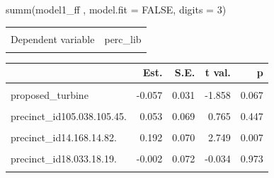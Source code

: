 \documentclass[
  letterpaper,
  DIV=11,
  numbers=noendperiod]{scrartcl}
\newenvironment{Shaded}{\begin{snugshade}}{\end{snugshade}}
\newcommand{\AttributeTok}[1]{\textcolor[rgb]{0.40,0.45,0.13}{#1}}
\newcommand{\ConstantTok}[1]{\textcolor[rgb]{0.56,0.35,0.01}{#1}}
\newcommand{\DecValTok}[1]{\textcolor[rgb]{0.68,0.00,0.00}{#1}}
\newcommand{\FunctionTok}[1]{\textcolor[rgb]{0.28,0.35,0.67}{#1}}
\newcommand{\NormalTok}[1]{\textcolor[rgb]{0.00,0.23,0.31}{#1}}
\begin{document}
\begin{Shaded}
\begin{Highlighting}[]
\FunctionTok{summ}\NormalTok{(model1\_ff , }\AttributeTok{model.fit =} \ConstantTok{FALSE}\NormalTok{, }\AttributeTok{digits =} \DecValTok{3}\NormalTok{)}
\end{Highlighting}
\end{Shaded}

\begin{table}[!h]
\centering
\begin{tabular}{lr}
\toprule
\cellcolor{gray!10}{Observations} & \cellcolor{gray!10}{120}\\
Dependent variable & perc\_lib\\
\cellcolor{gray!10}{Type} & \cellcolor{gray!10}{OLS linear regression}\\
\bottomrule
\end{tabular}
\end{table}  \begin{table}[!h]
\centering
\begin{threeparttable}
\begin{tabular}{lrrrr}
\toprule
  & Est. & S.E. & t val. & p\\
\midrule
\cellcolor{gray!10}{(Intercept)} & \cellcolor{gray!10}{0.275} & \cellcolor{gray!10}{0.050} & \cellcolor{gray!10}{5.460} & \cellcolor{gray!10}{0.000}\\
proposed\_turbine & -0.057 & 0.031 & -1.858 & 0.067\\
\cellcolor{gray!10}{precinct\_id10.115s.10.84.} & \cellcolor{gray!10}{0.166} & \cellcolor{gray!10}{0.069} & \cellcolor{gray!10}{2.402} & \cellcolor{gray!10}{0.019}\\
precinct\_id105.038.105.45. & 0.053 & 0.069 & 0.765 & 0.447\\
\cellcolor{gray!10}{precinct\_id14.149.14.79.} & \cellcolor{gray!10}{0.208} & \cellcolor{gray!10}{0.070} & \cellcolor{gray!10}{2.976} & \cellcolor{gray!10}{0.004}\\
\addlinespace
precinct\_id14.168.14.82. & 0.192 & 0.070 & 2.749 & 0.007\\
\cellcolor{gray!10}{precinct\_id18.003.18.1.} & \cellcolor{gray!10}{0.121} & \cellcolor{gray!10}{0.070} & \cellcolor{gray!10}{1.738} & \cellcolor{gray!10}{0.086}\\
precinct\_id18.033.18.19. & -0.002 & 0.072 & -0.034 & 0.973\\
\cellcolor{gray!10}{precinct\_id21.126.21.179.} & \cellcolor{gray!10}{0.204} & \cellcolor{gray!10}{0.069} & \cellcolor{gray!10}{2.950} & \cellcolor{gray!10}{0.004}\\

\end{tabular}
\end{threeparttable}
\end{table}
\end{document}
